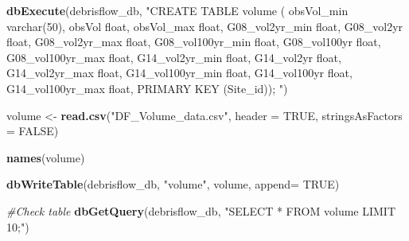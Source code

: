 \documentclass[
]{book}
\newenvironment{Shaded}{\begin{snugshade}}{\end{snugshade}}
\newcommand{\CommentTok}[1]{\textcolor[rgb]{0.56,0.35,0.01}{\textit{#1}}}
\newcommand{\DataTypeTok}[1]{\textcolor[rgb]{0.13,0.29,0.53}{#1}}
\newcommand{\KeywordTok}[1]{\textcolor[rgb]{0.13,0.29,0.53}{\textbf{#1}}}
\newcommand{\NormalTok}[1]{#1}
\newcommand{\OtherTok}[1]{\textcolor[rgb]{0.56,0.35,0.01}{#1}}
\newcommand{\StringTok}[1]{\textcolor[rgb]{0.31,0.60,0.02}{#1}}
\begin{document}
\begin{Shaded}
\begin{Highlighting}[]
\KeywordTok{dbExecute}\NormalTok{(debrisflow_db, }\StringTok{"CREATE TABLE volume (}
\StringTok{          obsVol_min varchar(50),}
\StringTok{          obsVol float,}
\StringTok{          obsVol_max float,}
\StringTok{          G08_vol2yr_min float,}
\StringTok{          G08_vol2yr float,}
\StringTok{          G08_vol2yr_max float,}
\StringTok{          G08_vol100yr_min float,}
\StringTok{          G08_vol100yr float,}
\StringTok{          G08_vol100yr_max float,}
\StringTok{          G14_vol2yr_min float, }
\StringTok{          G14_vol2yr float,}
\StringTok{          G14_vol2yr_max float,}
\StringTok{          G14_vol100yr_min float, }
\StringTok{          G14_vol100yr float,}
\StringTok{          G14_vol100yr_max float,}
\StringTok{          PRIMARY KEY (Site_id));}
\StringTok{          "}\NormalTok{)}

\NormalTok{volume <-}\StringTok{ }\KeywordTok{read.csv}\NormalTok{(}\StringTok{"DF_Volume_data.csv"}\NormalTok{, }\DataTypeTok{header =} \OtherTok{TRUE}\NormalTok{, }\DataTypeTok{stringsAsFactors =} \OtherTok{FALSE}\NormalTok{)}

\KeywordTok{names}\NormalTok{(volume)}

\KeywordTok{dbWriteTable}\NormalTok{(debrisflow_db, }\StringTok{"volume"}\NormalTok{, volume, }\DataTypeTok{append=} \OtherTok{TRUE}\NormalTok{)}
\end{Highlighting}
\end{Shaded}

\begin{Shaded}
\begin{Highlighting}[]
\CommentTok{#Check table}
\KeywordTok{dbGetQuery}\NormalTok{(debrisflow_db, }\StringTok{"SELECT * FROM volume LIMIT 10;"}\NormalTok{)}
\end{Highlighting}
\end{Shaded}
\end{document}
